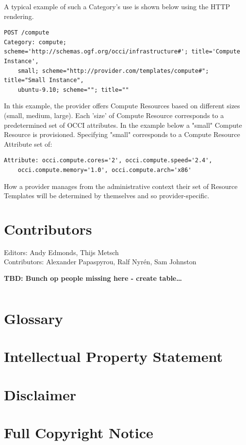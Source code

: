 \documentclass[10pt,a4paper]{article}
\begin{document}
A typical example of such a Category's use is shown below using the HTTP rendering. 

\begin{verbatim}
POST /compute
Category: compute; scheme='http://schemas.ogf.org/occi/infrastructure#'; title='Compute Instance', 
    small; scheme="http://provider.com/templates/compute#"; title="Small Instance", 
    ubuntu-9.10; scheme=""; title=""
\end{verbatim}

In this example, the provider offers Compute Resources based on different sizes (small, medium, large). Each 'size' of Compute Resource corresponds to a predetermined set of OCCI attributes. In the example below a "small" Compute Resource is provisioned. Specifying "small" corresponds to a Compute Resource Attribute set of:

\begin{verbatim}
Attribute: occi.compute.cores='2', occi.compute.speed='2.4', 
    occi.compute.memory='1.0', occi.compute.arch='x86'
\end{verbatim}

How a provider manages from the administrative context their set of Resource Templates will be determined by themselves and so provider-specific.


\section{Contributors}

Editors: Andy Edmonds, Thijs Metsch \\
Contributors: Alexander Papaspyrou, Ralf Nyr\'en, Sam Johnston

\textbf{TBD: Bunch op people missing here - create table\ldots}

\begin{verbatim}

\end{verbatim}

\section{Glossary}


\section{Intellectual Property Statement}


\section{Disclaimer}


\section{Full Copyright Notice}




\end{document}
